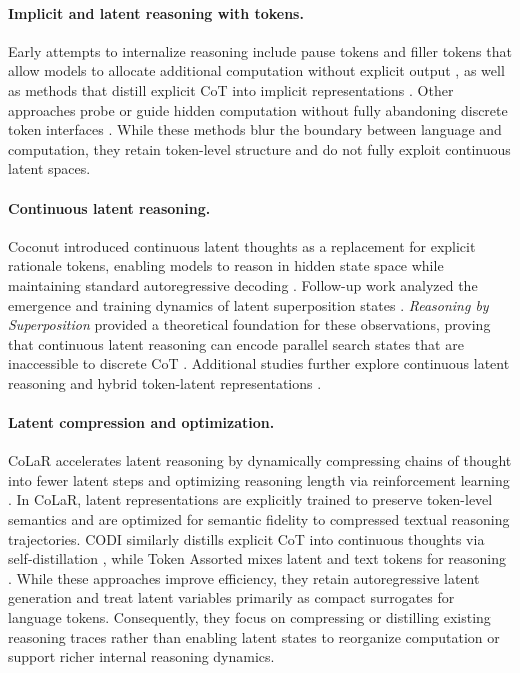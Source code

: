 \paragraph{Implicit and latent reasoning with tokens.}
Early attempts to internalize reasoning include pause tokens and filler tokens that allow models to allocate additional computation without explicit output \cite{goyal2023think}, as well as methods that distill explicit CoT into implicit representations \cite{deng2024explicit,deng2024implicit}. Other approaches probe or guide hidden computation without fully abandoning discrete token interfaces \cite{pfau2024lets,wang2024guiding}. While these methods blur the boundary between language and computation, they retain token-level structure and do not fully exploit continuous latent spaces.

\paragraph{Continuous latent reasoning.}
Coconut introduced continuous latent thoughts as a replacement for explicit rationale tokens, enabling models to reason in hidden state space while maintaining standard autoregressive decoding \cite{hao2024training}. Follow-up work analyzed the emergence and training dynamics of latent superposition states \cite{zhu2025emergence}. \emph{Reasoning by Superposition} provided a theoretical foundation for these observations, proving that continuous latent reasoning can encode parallel search states that are inaccessible to discrete CoT \cite{zhu2025reasoning}. Additional studies further explore continuous latent reasoning and hybrid token-latent representations \cite{gozeten2025continuous,su2025token}.

\paragraph{Latent compression and optimization.}
CoLaR accelerates latent reasoning by dynamically compressing chains of thought into fewer latent steps and optimizing reasoning length via reinforcement learning \cite{tan2025think}. In CoLaR, latent representations are explicitly trained to preserve token-level semantics and are optimized for semantic fidelity to compressed textual reasoning trajectories. CODI similarly distills explicit CoT into continuous thoughts via self-distillation \cite{shen2025compressing}, while Token Assorted mixes latent and text tokens for reasoning \cite{su2025token}. While these approaches improve efficiency, they retain autoregressive latent generation and treat latent variables primarily as compact surrogates for language tokens. Consequently, they focus on compressing or distilling existing reasoning traces rather than enabling latent states to reorganize computation or support richer internal reasoning dynamics.

